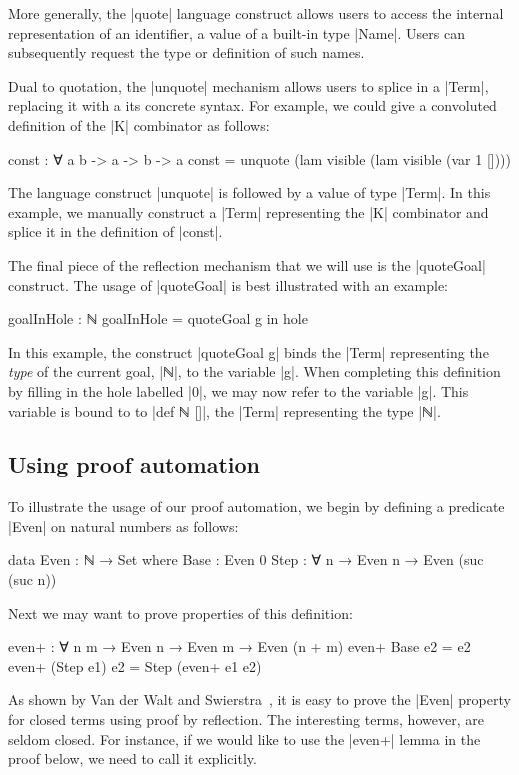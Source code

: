 \documentclass[preprint]{sigplanconf}
\begin{document}
More generally, the |quote| language construct allows users to access
the internal representation of an identifier, a value of a built-in
type |Name|. Users can subsequently request the type or definition of
such names.

Dual to quotation, the |unquote| mechanism allows users to splice in a
|Term|, replacing it with a its concrete syntax. For example, we could
give a convoluted definition of the |K| combinator as follows:
\begin{code}
  const : ∀ {a b} -> a  -> b -> a
  const = unquote (lam visible (lam visible (var 1 [])))
\end{code}
The language construct |unquote| is followed by a value of type
|Term|. In this example, we manually construct a |Term| representing
the |K| combinator and splice it in the definition of |const|.

The final piece of the reflection mechanism that we will use is the
|quoteGoal| construct. The usage of |quoteGoal| is best illustrated
with an example:
\begin{code}
  goalInHole : ℕ
  goalInHole = quoteGoal g in hole
\end{code}
In this example, the construct |quoteGoal g| binds the |Term|
representing the \emph{type} of the current goal, |ℕ|, to the variable
|g|. When completing this definition by filling in the hole labelled
|0|, we may now refer to the variable |g|. This variable is bound to
to |def ℕ []|, the |Term| representing the type |ℕ|.

\subsection*{Using proof automation}

To illustrate the usage of our proof automation, we begin by defining a
predicate |Even| on natural numbers as follows:

\begin{code}
  data Even : ℕ → Set where
    Base : Even 0
    Step : ∀ {n} → Even n → Even (suc (suc n))
\end{code}
%
Next we may want to prove properties of this definition:
%
\begin{code}
  even+ : ∀ {n m} → Even n → Even m → Even (n + m)
  even+ Base       e2  = e2
  even+ (Step e1)  e2  = Step (even+ e1 e2)
\end{code}
%
As shown by Van der Walt and Swierstra~\cite{van-der-walt}, it is easy
to prove the |Even| property for closed terms using proof by
reflection. The interesting terms, however, are seldom closed.  For
instance, if we would like to use the |even+| lemma in the proof
below, we need to call it explicitly.
\end{document}
